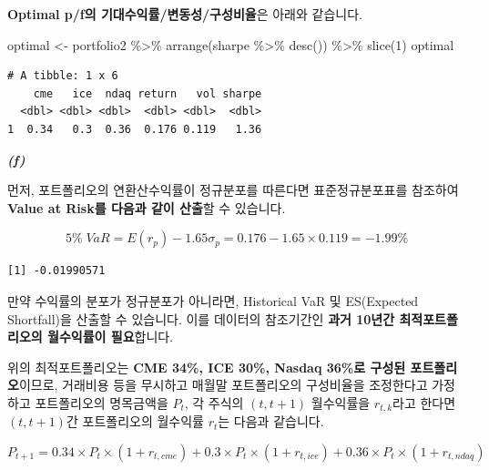 \documentclass[
  a4paper,
  DIV=11,
  numbers=noendperiod]{scrreprt}
\newenvironment{Shaded}{\begin{snugshade}}{\end{snugshade}}
\newcommand{\DecValTok}[1]{\textcolor[rgb]{0.68,0.00,0.00}{#1}}
\newcommand{\FloatTok}[1]{\textcolor[rgb]{0.68,0.00,0.00}{#1}}
\newcommand{\FunctionTok}[1]{\textcolor[rgb]{0.28,0.35,0.67}{#1}}
\newcommand{\NormalTok}[1]{\textcolor[rgb]{0.00,0.23,0.31}{#1}}
\newcommand{\OtherTok}[1]{\textcolor[rgb]{0.00,0.23,0.31}{#1}}
\newcommand{\SpecialCharTok}[1]{\textcolor[rgb]{0.37,0.37,0.37}{#1}}
\begin{document}
\textbf{Optimal p/f의 기대수익률/변동성/구성비율}은 아래와 같습니다.

\begin{Shaded}
\begin{Highlighting}[]
\NormalTok{optimal }\OtherTok{\textless{}{-}}\NormalTok{ portfolio2 }\SpecialCharTok{\%\textgreater{}\%} \FunctionTok{arrange}\NormalTok{(sharpe }\SpecialCharTok{\%\textgreater{}\%} \FunctionTok{desc}\NormalTok{()) }\SpecialCharTok{\%\textgreater{}\%} \FunctionTok{slice}\NormalTok{(}\DecValTok{1}\NormalTok{)}
\NormalTok{optimal}
\end{Highlighting}
\end{Shaded}

\begin{verbatim}
# A tibble: 1 x 6
    cme   ice  ndaq return   vol sharpe
  <dbl> <dbl> <dbl>  <dbl> <dbl>  <dbl>
1  0.34   0.3  0.36  0.176 0.119   1.36
\end{verbatim}

\textbf{\emph{(f)}}

먼저, 포트폴리오의 연환산수익률이 정규분포를 따른다면 표준정규분포표를
참조하여 \textbf{Value at Risk를 다음과 같이 산출}할 수 있습니다.

\[5\%\;VaR=E(r_p)-1.65\sigma_p=0.176-1.65\times 0.119=-1.99\%\]

\begin{Shaded}
\end{Shaded}

\begin{verbatim}
[1] -0.01990571
\end{verbatim}

만약 수익률의 분포가 정규분포가 아니라면, Historical VaR 및 ES(Expected
Shortfall)을 산출할 수 있습니다. 이를 데이터의 참조기간인 \textbf{과거
10년간 최적포트폴리오의 월수익률이 필요}합니다.

위의 최적포트폴리오는 \textbf{CME 34\%, ICE 30\%, Nasdaq 36\%로 구성된
포트폴리오}이므로, 거래비용 등을 무시하고 매월말 포트폴리오의 구성비율을
조정한다고 가정하고 포트폴리오의 명목금액을 \(P_t\), 각 주식의
\((t,t+1)\) 월수익률을 \(r_{t,k}\)라고 한다면 \((t,t+1)\)간 포트폴리오의
월수익률 \(r_t\)는 다음과 같습니다.

\[P_{t+1}=0.34\times P_t\times (1+r_{t,cme})+0.3\times P_t\times (1+r_{t,ice})+0.36\times P_t\times (1+r_{t,ndaq})\]
\end{document}
